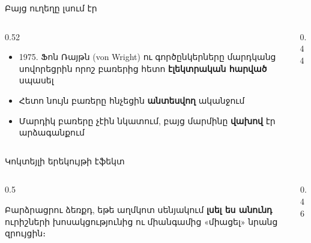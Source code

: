 \begin{frame}{Բայց ուղեղը լսում էր}
  \begin{columns}[T]
    \begin{column}{0.52\textwidth}
      \begin{itemize}
        \item 1975. Ֆոն Ռայթն (von Wright) ու գործընկերները մարդկանց սովորեցրին որոշ բառերից հետո \textbf{էլեկտրական հարված} սպասել 
        \item<2-> Հետո նույն բառերը հնչեցին \textbf{անտեսվող} ականջում
        \item<3-> Մարդիկ բառերը չէին նկատում, բայց մարմինը \textbf{վախով} էր արձագանքում
      \end{itemize}
    \end{column}
    \begin{column}{0.44\textwidth}
    \end{column}
  \end{columns}
\end{frame}

\begin{frame}{Կոկտեյլի երեկույթի էֆեկտ}
  \begin{columns}[T]
    \begin{column}{0.5\textwidth}
      \begin{poll}
        Բարձրացրու ձեռքդ, եթե աղմկոտ սենյակում \textbf{լսել ես անունդ} ուրիշների խոսակցությունից ու միանգամից «միացել» նրանց զրույցին։
      \end{poll}
      \vspace{1mm}
    \end{column}
    \begin{column}{0.46\textwidth}
    \end{column}
  \end{columns}
\end{frame}

